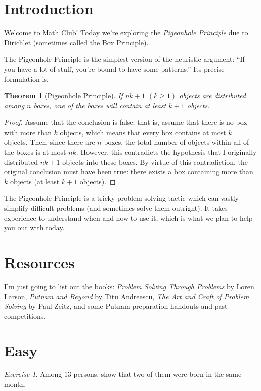 \documentclass{article}
\newtheorem{theorem}{Theorem}[section]
\theoremstyle{definition}
\theoremstyle{remark}
\newtheorem{exercise}{Exercise}
\begin{document}
\section{Introduction}

Welcome to Math Club! Today we're exploring the \emph{Pigeonhole Principle} due to Dirichlet (sometimes called the Box Principle).

The Pigeonhole Principle is the simplest version of the heuristic argument: ``If you have a lot of stuff, you're bound to have some patterns.'' Its precise formulation is, 
\begin{theorem}[Pigeonhole Principle]
If $nk+1$ $(k\geq 1)$ objects are distributed among $n$ boxes, one of the boxes will contain at least $k+1$ objects.
\end{theorem}
\begin{proof}
Assume that the conclusion is false; that is, assume that there is no box with more than $k$ objects, which means that every box contains at most $k$ objects. Then, since there are $n$ boxes, the total number of objects within all of the boxes is at most $nk$. However, this contradicts the hypothesis that I originally distributed $nk+1$ objects into these boxes. By virtue of this contradiction, the original conclusion must have been true: there exists a box containing more than $k$ objects (at least $k+1$ objects).
\end{proof}
The Pigeonhole Principle is a tricky problem solving tactic which can vastly simplify difficult problems (and sometimes solve them outright). It takes experience to understand when and how to use it, which is what we plan to help you out with today.
 
\section{Resources}

I'm just going to list out the books: \emph{Problem Solving Through Problems} by Loren Larson, \emph{Putnam and Beyond} by Titu Andreescu, \emph{The Art and Craft of Problem Solving} by Paul Zeitz, and some Putnam preparation handouts and past competitions.

\section{Easy}

\begin{exercise}
Among $13$ persons, show that two of them were born in the same month.
\end{exercise}
\end{document}

